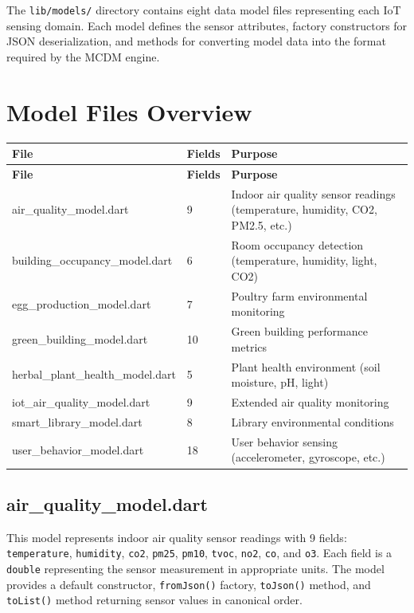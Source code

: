 \documentclass[12pt,a4paper,oneside]{report}
\newcommand{\code}[1]{\texttt{#1}}
\begin{document}
The \texttt{lib/models/} directory contains eight data model files representing each IoT sensing domain. Each model defines the sensor attributes, factory constructors for JSON deserialization, and methods for converting model data into the format required by the MCDM engine.

\section{Model Files Overview}

\begin{longtable}{p{4cm} p{3cm} p{8.5cm}}
\toprule
\textbf{File} & \textbf{Fields} & \textbf{Purpose} \\
\midrule
\endfirsthead
\toprule
\textbf{File} & \textbf{Fields} & \textbf{Purpose} \\
\midrule
\endhead
\bottomrule
\endfoot
air\_quality\_model.dart & 9 & Indoor air quality sensor readings (temperature, humidity, CO2, PM2.5, etc.) \\
building\_occupancy\_model.dart & 6 & Room occupancy detection (temperature, humidity, light, CO2) \\
egg\_production\_model.dart & 7 & Poultry farm environmental monitoring \\
green\_building\_model.dart & 10 & Green building performance metrics \\
herbal\_plant\_health\_model.dart & 5 & Plant health environment (soil moisture, pH, light) \\
iot\_air\_quality\_model.dart & 9 & Extended air quality monitoring \\
smart\_library\_model.dart & 8 & Library environmental conditions \\
user\_behavior\_model.dart & 18 & User behavior sensing (accelerometer, gyroscope, etc.) \\
\bottomrule
\end{longtable}

\subsection{air\_quality\_model.dart}

This model represents indoor air quality sensor readings with 9 fields: \code{temperature}, \code{humidity}, \code{co2}, \code{pm25}, \code{pm10}, \code{tvoc}, \code{no2}, \code{co}, and \code{o3}. Each field is a \code{double} representing the sensor measurement in appropriate units. The model provides a default constructor, \code{fromJson()} factory, \code{toJson()} method, and \code{toList()} method returning sensor values in canonical order.
\end{document}
